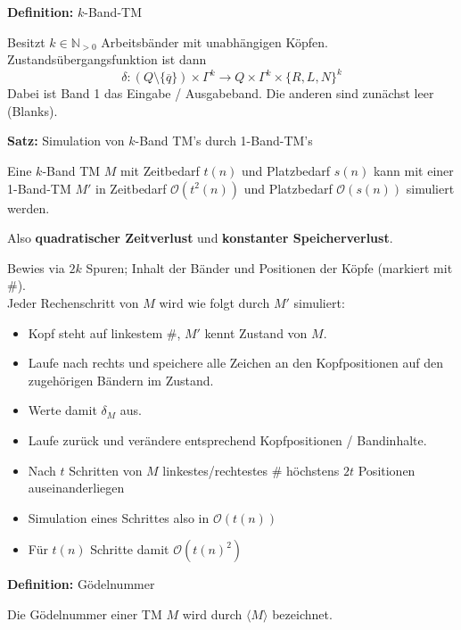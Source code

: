 \documentclass[a4paper,graphics,11pt]{article}
\begin{document}
\textbf{Definition:} $k$-Band-TM

Besitzt $k \in \mathbb{N}_{>0}$ Arbeitsbänder mit unabhängigen Köpfen.
Zustandsübergangsfunktion ist dann
$$
    \delta : (Q\setminus \{\overline{q}\}) \times \Gamma^k \to Q \times \Gamma^k \times \{R,L,N\}^k
$$
Dabei ist Band 1 das Eingabe / Ausgabeband. Die anderen sind zunächst leer (Blanks).

\strut

\textbf{Satz:} Simulation von $k$-Band TM's durch 1-Band-TM's

Eine $k$-Band TM $M$ mit Zeitbedarf $t(n)$ und Platzbedarf $s(n)$ kann mit einer 1-Band-TM $M'$
in Zeitbedarf $\mathcal{O}(t^2(n))$ und Platzbedarf $\mathcal{O}(s(n))$ simuliert werden.

Also \textbf{quadratischer Zeitverlust} und \textbf{konstanter Speicherverlust}.

Bewies via $2k$ Spuren; Inhalt der Bänder und Positionen der Köpfe (markiert mit \#).\\
Jeder Rechenschritt von $M$ wird wie folgt durch $M'$ simuliert:
\begin{itemize}
    \item Kopf steht auf linkestem \#, $M'$ kennt Zustand von $M$.
    \item Laufe nach rechts und speichere alle Zeichen an den Kopfpositionen auf den
        zugehörigen Bändern im Zustand.
    \item Werte damit $\delta_M$ aus.
    \item Laufe zurück und verändere entsprechend Kopfpositionen / Bandinhalte.
    \\
    \item Nach $t$ Schritten von $M$ linkestes/rechtestes \# höchstens $2t$ Positionen auseinanderliegen
    \item Simulation eines Schrittes also in $\mathcal{O}(t(n))$
    \item Für $t(n)$ Schritte damit $\mathcal{O}(t(n)^2)$
\end{itemize}

\newpage

\textbf{Definition:} Gödelnummer

Die Gödelnummer einer TM $M$ wird durch $\langle M \rangle$ bezeichnet.
\end{document}
